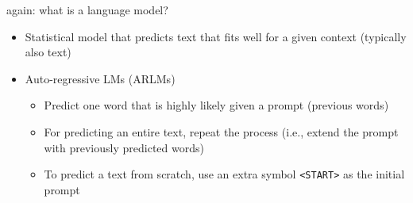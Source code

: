 \documentclass[11pt,compress,t,notes=noshow, xcolor=table]{beamer}
\begin{document}


\begin{frame}{again: what is a language model?}

\vfill

\begin{itemize}
	\item Statistical model that predicts text that fits well for a given context (typically also text)
	\item Auto-regressive LMs (ARLMs)
	\begin{itemize}
		\item Predict one word that is highly likely given a prompt (previous words)
		\item For predicting an entire text, repeat the process (i.e., extend the prompt with previously predicted words)
		\item To predict a text from scratch, use an extra symbol \texttt{<START>} as the initial prompt
	\end{itemize}
\end{itemize}

\vfill

\end{frame}

\end{document}
